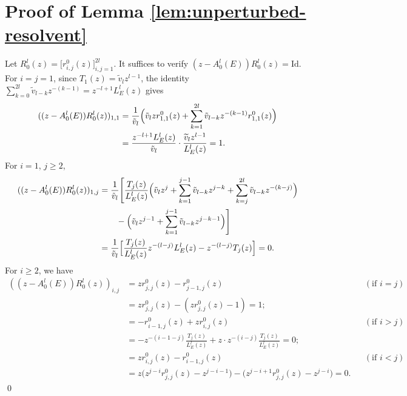 \documentclass[reqno,11pt]{amsart}
\begin{document}
\appendix

\section{Proof of Lemma \ref{lem:unperturbed-resolvent}}\label{appendixa}
Let $R^{l}_0(z)= \bigl[r_{i,j}^0(z)\bigr]_{i,j=1}^{2l}.$
It suffices to verify $(z-A_{0}^{l}(E))R^{l}_0(z)=\mathrm{Id}$.
For $i=j=1$, since $T_1(z)=\widetilde v_l z^{l-1}$, the identity $\sum_{k=0}^{2l}\widetilde v_{l-k}z^{-(k-1)} = z^{-l+1}L^{l}_{E}(z)$ gives
$$
\begin{aligned}
((z-A_{0}^{l}(E))R^{l}_0(z))_{1,1}
&= \frac{1}{\tilde v_l}\Bigl(\tilde v_l z r_{1,1}^0(z) + \sum_{k=1}^{2l}{\tilde v_{l-k}}z^{-(k-1)}r_{1,1}^0(z)\Bigr)\\
&= \frac{z^{-l+1}L^{l}_{E}(z)}{\tilde v_l}\cdot\frac{\widetilde v_l z^{l-1}}{L^{l}_{E}(z)} = 1.
\end{aligned}
$$
For $i=1$, $j\ge 2$,
$$
\begin{aligned}
((z-A_{0}^{l}(E))R^{l}_0(z))_{1,j}
&= \frac{1}{\tilde v_l}\Biggl[
\frac{T_j(z)}{L^{l}_{E}(z)}
\Bigl(
\tilde v_l z^j + \sum_{k=1}^{j-1}\tilde v_{l-k} z^{j-k} + \sum_{k=j}^{2l}\tilde v_{l-k} z^{-(k-j)}
\Bigr)\\
&\qquad - \Bigl(\tilde v_l z^{j-1} + \sum_{k=1}^{j-1}\tilde v_{l-k} z^{j-k-1}\Bigr)\Biggr]\\
&= \frac{1}{\tilde v_l}\Bigl[\frac{T_j(z)}{L^{l}_{E}(z)}z^{-(l-j)}L^{l}_{E}(z) - z^{-(l-j)}T_j(z)\Bigr] = 0.
\end{aligned}
$$
For $i\ge 2$, we have
$$
\begin{aligned}
((z-A_{0}^{l}(E))R^{l}_0(z))_{i,j}
&= zr_{j,j}^0(z)-r_{j-1,j}^0(z) && (\text{if } i=j)\\
&= zr_{j,j}^0(z)-(zr_{j,j}^0(z)-1) = 1;\\
&= -r_{i-1,j}^0(z)+zr_{i,j}^0(z) && (\text{if } i>j)\\
&= -z^{-(i-1-j)}\frac{T_j(z)}{L^{l}_{E}(z)} + z\cdot z^{-(i-j)}\frac{T_j(z)}{L^{l}_{E}(z)} = 0;\\
&= zr_{i,j}^0(z)-r_{i-1,j}^0(z) && (\text{if } i<j)\\
&= z\bigl(z^{j-i}r_{j,j}^0(z)-z^{j-i-1}\bigr) - \bigl(z^{j-i+1}r_{j,j}^0(z)-z^{j-i}\bigr) = 0.
\end{aligned}
$$
\qed
\end{document}
